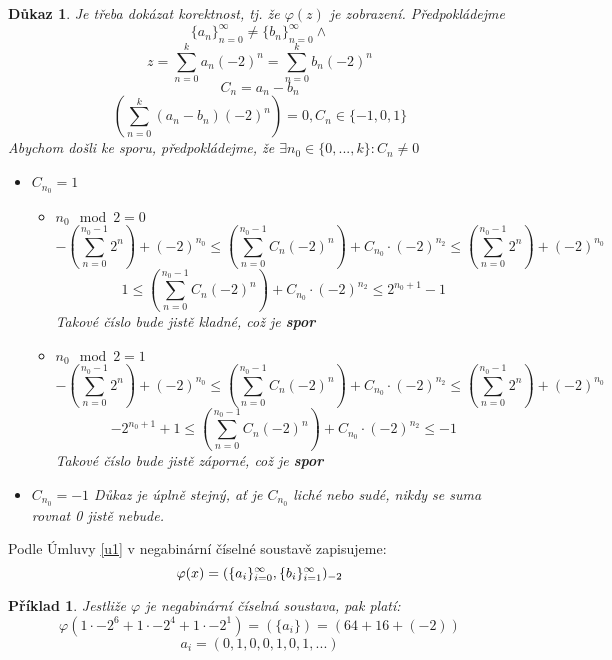 \documentclass[12pt]{book}
\newtheorem{pr}{Příklad}
\newtheorem{dukaz}{Důkaz}
\begin{document}
\newpage
\begin{dukaz}
	Je třeba dokázat korektnost, tj. že $\varphi(z)$ je zobrazení.
	Předpokládejme $$\{a_n\}_{n=0}^\infty \ne \{b_n\}_{n=0}^\infty \land$$ $$z=\sum_{n=0}^{k}a_n(-2)^n = \sum_{n=0}^{k}b_n(-2)^n$$
	$$C_n = a_n - b_n$$
	$$\left(\sum_{n=0}^k(a_n-b_n)(-2)^n\right) = 0 , C_n \in \{-1, 0 ,1\}$$
	Abychom došli ke sporu, předpokládejme, že $\exists n_0 \in \{0,...,k\}: C_n \ne 0$
	\begin{itemize}
		\item[$\alpha)$]$C_{n_0} = 1$
		\begin{itemize}
			\item[I.)] $n_0 \mod2 = 0$
			$$-\left(\sum_{n=0}^{n_0-1}2^n\right)+(-2)^{n_0}\leq \left(\sum_{n=0}^{n_0-1}C_n(-2)^n\right)+C_{n_0}\cdot(-2)^{n_2}  \leq\left(\sum_{n=0}^{n_0-1}2^n\right)+(-2)^{n_0}$$
			$$1\leq \left(\sum_{n=0}^{n_0-1}C_n(-2)^n\right)+C_{n_0}\cdot(-2)^{n_2}  \leq 2^{n_0 + 1}-1$$
			Takové číslo bude jistě kladné, což je \textbf{spor}
			\item[II.)] $n_0 \mod2 = 1$
			$$-\left(\sum_{n=0}^{n_0-1}2^n\right)+(-2)^{n_0}\leq \left(\sum_{n=0}^{n_0-1}C_n(-2)^n\right)+C_{n_0}\cdot(-2)^{n_2}  \leq\left(\sum_{n=0}^{n_0-1}2^n\right)+(-2)^{n_0}$$
			$$-2^{n_0+1}+1\leq \left(\sum_{n=0}^{n_0-1}C_n(-2)^n\right)+C_{n_0}\cdot(-2)^{n_2}  \leq -1$$
			Takové číslo bude jistě záporné, což je \textbf{spor}
			
		\end{itemize}
		\item[$\beta)$]$C_{n_0} = -1$\newline
		Důkaz je úplně stejný, ať je $C_{n_0}$ liché nebo sudé, nikdy se suma rovnat 0 jistě nebude.
	\end{itemize}
\end{dukaz}
	\newpage
	Podle Úmluvy \ref{u1} v negabinární číselné soustavě zapisujeme:
	$$\varphi(x) = (\{a_i\}_{i=0}^{\infty},\{b_i\}_{i=1}^{\infty})_{-2}$$


\begin{pr}
	Jestliže $\varphi$ je negabinární číselná soustava, pak platí:
	$$\varphi(1\cdot-2^6+1\cdot-2^4+1\cdot-2^1)=(\{a_i\})=(64+16+(-2))$$
	$${a_i}=(0,1,0,0,1,0,1,...) $$
\end{pr}


\newpage
\end{document}
